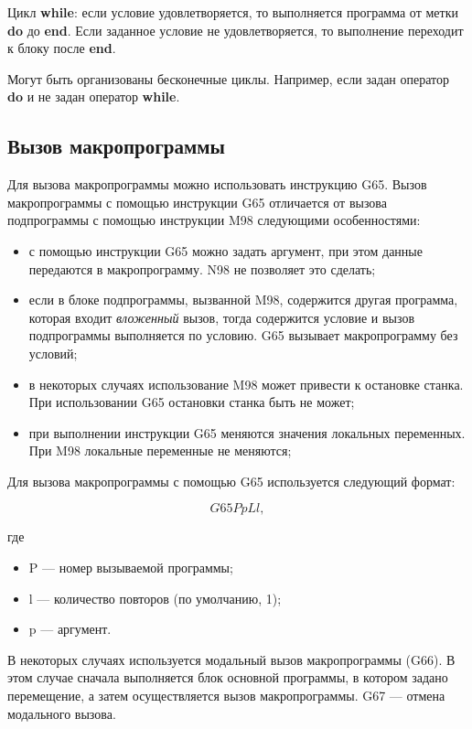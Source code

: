 Цикл \textbf{while}: если условие удовлетворяется, то выполняется программа от метки \textbf{do} до \textbf{end}. Если заданное условие не удовлетворяется, то выполнение переходит к блоку после \textbf{end}.

Могут быть организованы бесконечные циклы. Например, если задан оператор \textbf{do} и не задан оператор \textbf{while}.

\subsection{Вызов макропрограммы}

Для вызова макропрограммы можно использовать инструкцию G65. Вызов макропрограммы с помощью инструкции G65 отличается от вызова подпрограммы с помощью инструкции M98 следующими особенностями:

\begin{itemize}
    \item с помощью инструкции G65 можно задать аргумент, при этом данные передаются в макропрограмму. N98 не позволяет это сделать;
    \item если в блоке подпрограммы, вызванной M98, содержится другая программа, которая входит \textit{вложенный} вызов, тогда содержится условие и вызов подпрограммы выполняется по условию. G65 вызывает макропрограмму без условий;
    \item в некоторых случаях использование M98 может привести к остановке станка. При использовании G65 остановки станка быть не может;
    \item при выполнении инструкции G65 меняются значения локальных переменных. При M98 локальные переменные не меняются;
\end{itemize}

Для вызова макропрограммы с помощью G65 используется следующий формат:

\begin{equation}
    G65 PpLl,
\end{equation}

где

\begin{itemize}
    \item P --- номер вызываемой программы;
    \item l --- количество повторов (по умолчанию, 1);
    \item p --- аргумент.
\end{itemize}

В некоторых случаях используется модальный вызов макропрограммы (G66). В этом случае сначала выполняется блок основной программы, в котором задано перемещение, а затем осуществляется вызов макропрограммы. G67 --- отмена модального вызова.

